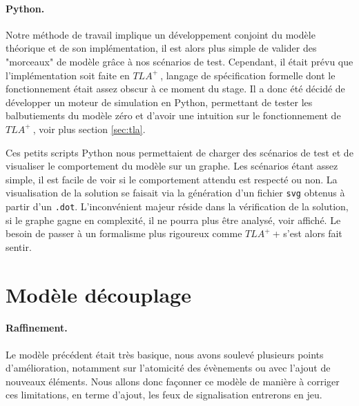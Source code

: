 \documentclass[oneside, a4paper, 11pt]{book}
\newcommand{\TLA}{\ensuremath{TLA^+~}}
\begin{document}
\paragraph{Python.}
Notre méthode de travail implique un développement conjoint du modèle théorique et de son implémentation, il est alors plus simple de valider des "morceaux" de modèle grâce à nos scénarios de test.
Cependant, il était prévu que l'implémentation soit faite en \TLA, langage de spécification formelle dont le fonctionnement était assez obscur à ce moment du stage.
Il a donc été décidé de développer un moteur de simulation en Python, permettant de tester les balbutiements du modèle zéro et d'avoir une intuition sur le fonctionnement de \TLA, voir plus section \ref{sec:tla}.


\begin{figure}
\end{figure}


Ces petits scripts Python nous permettaient de charger des scénarios de test et de visualiser le comportement du modèle sur un graphe. Les scénarios étant assez simple, il est facile de voir si le comportement attendu est respecté ou non.
La visualisation de la solution se faisait via la génération d'un fichier \texttt{svg} obtenus à partir d'un \texttt{.dot}. L'inconvénient majeur réside dans la vérification de la solution, si le graphe gagne en complexité, il ne pourra plus être analysé, voir affiché.
Le besoin de passer à un formalisme plus rigoureux comme \TLA+ s'est alors fait sentir.












\section{Modèle découplage}

\paragraph{Raffinement.} Le modèle précédent était très basique, nous avons soulevé plusieurs points d'amélioration, notamment sur l'atomicité des évènements ou avec l'ajout de nouveaux éléments. Nous allons donc façonner ce modèle de manière à corriger ces limitations, en terme d'ajout, les feux de signalisation entrerons en jeu.
\end{document}
